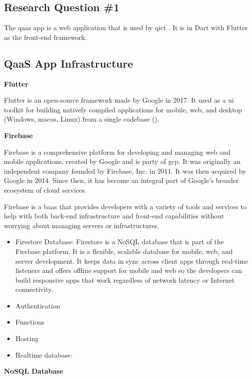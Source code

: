 \begin{multicols}{2}
    \section{Research Question \#1}
    The \acrshort{qaas} app is a web application that is used by \acrshort{qict} . It is in Dart with Flutter as the front-end framework.

    \subsection{QaaS App Infrastructure}
    \textbf{Flutter}

    Flutter is an open-source framework made by Google in 2017. It used as a \acrshort{ui} toolkit for building natively compiled
    applications for mobile, web, and desktop (Windows, mac\acrshort{os}, Linux) from a single codebase (\cite{flutter}).

    \textbf{Firebase}

    Firebase is a comprehensive platform for developing and managing web and mobile applications, created by Google and is party
    of \acrshort{gcp}. It was originally an independent company founded by Firebase, Inc. in 2011. It was then acquired by Google in 2014.
    Since then, it has become an integral part of Google's broader ecosystem of cloud services.

    Firebase is a \acrshort{baas} that provides developers with a variety of tools and services to help with both back-end infrastructure
    and front-end capabilities without worrying about managing servers or infrastructures.
    \begin{itemize}
        \item Firestore Database: Firestore is a NoSQL database that is part of the Firebase platform. It is a flexible, scalable database
              for mobile, web, and server development. It keeps data in sync across client apps through real-time listeners and offers offline
              support for mobile and web so the developers can build responsive apps that work regardless of network latency or Internet connectivity.
        \item Authentication
        \item Functions
        \item Hosting
        \item Realtime database:
    \end{itemize}

    \textbf{NoSQL Database}


\end{multicols}

